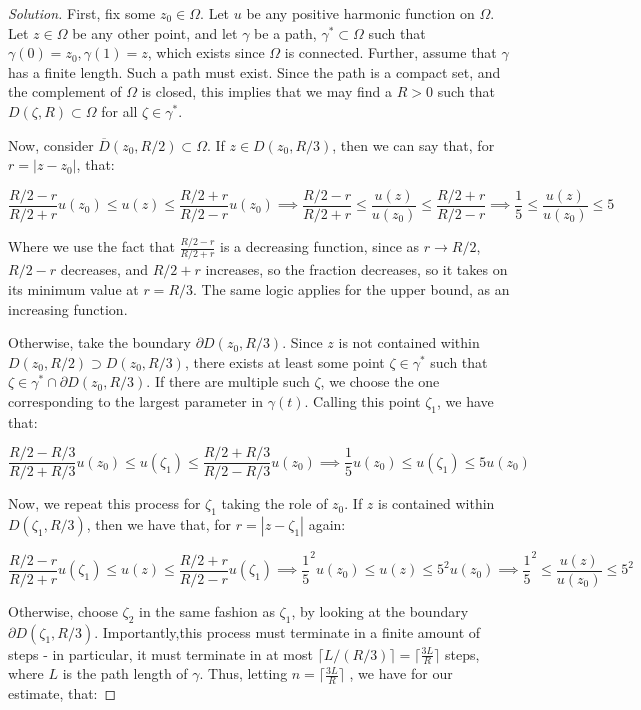 \documentclass[10pt]{article}
\begin{document}
\begin{proof}[Solution]

First, fix some $z_0 \in \Omega$. Let $u$ be any positive harmonic function on $\Omega$. Let $z \in \Omega$ be any other point, and let $\gamma$ be a path, $\gamma^* \subset \Omega$ such that $\gamma(0) = z_0, \gamma(1)= z$, which exists since $\Omega$ is connected. Further, assume that $\gamma$ has a finite length. Such a path must exist.  Since the path is a compact set, and the complement of $\Omega$ is closed, this implies that we may find a $R > 0$ such that $D(\zeta,R) \subset \Omega$ for all $\zeta \in \gamma^*$.

Now, consider $\overline{D}(z_0,R/2) \subset \Omega$. If $z \in D(z_0,R/3)$, then we can say that, for $r = |z - z_0|$, that:

$$ \frac{R/2 - r}{R/2 + r} u(z_0) \leq u(z) \leq \frac{R/2 + r}{R/2 - r} u(z_0) \implies   \frac{R/2 - r}{R/2 + r}  \leq \frac{u(z)}{u(z_0)} \leq \frac{R/2 + r}{R/2 - r} \implies  \frac{1}{5} \leq \frac{u(z)}{u(z_0)} \leq 5 $$

Where we use the fact that $\frac{R/2 - r}{R/2 + r}$ is a decreasing function, since as $r \to R/2$, $R/2 - r$ decreases, and $R/2 + r$ increases, so the fraction decreases, so it takes on its minimum value at $r = R/3$. The same logic applies for the upper bound, as an increasing function.

Otherwise, take the boundary $\partial D(z_0,R/3)$. Since $z$ is not contained within $D(z_0,R/2) \supset  D(z_0,R/3)$, there exists at least some point $\zeta \in \gamma^*$ such that $\zeta \in \gamma^* \cap \partial D(z_0,R/3)$. If there are multiple such $\zeta$, we choose the one corresponding to the largest parameter in $\gamma(t)$. Calling this point $\zeta_1$, we have that:

$$  \frac{R/2 - R/3}{R/2 + R/3} u(z_0) \leq u(\zeta_1) \leq \frac{R/2 +R/3}{R/2 - R/3} u(z_0) \implies \frac{1}{5} u(z_0) \leq u(\zeta_1) \leq 5u(z_0) $$

Now, we repeat this process for $\zeta_1$ taking the role of $z_0$. If $z$ is contained within $D(\zeta_1,R/3)$, then we have that, for $r = |z - \zeta_1|$ again:

$$  \frac{R/2 - r}{R/2 + r} u(\zeta_1) \leq u(z) \leq \frac{R/2 + r}{R/2 - r} u(\zeta_1) \implies  \frac{1}{5}^2  u(z_0) \leq u(z) \leq  5^2u(z_0) \implies  \frac{1}{5}^2  \leq  \frac{u(z)}{u(z_0)} \leq  5^2 $$

Otherwise, choose $\zeta_2$ in the same fashion as $\zeta_1$, by looking at the boundary  $\partial D(\zeta_1,R/3)$. Importantly,this process must terminate in a finite amount of steps - in particular, it must terminate in at most $\lceil L/(R/3)\rceil = \lceil \frac{3L}{R} \rceil$ steps, where $L$ is the path length of $\gamma$. Thus, letting $n =  \lceil \frac{3L}{R} \rceil$ , we have for our estimate, that:


\end{proof}
\end{document}
